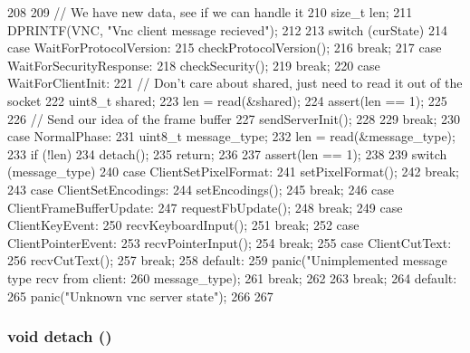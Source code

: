 \begin{DoxyCode}
208 {
209     // We have new data, see if we can handle it
210     size_t len;
211     DPRINTF(VNC, "Vnc client message recieved\n");
212 
213     switch (curState) {
214       case WaitForProtocolVersion:
215         checkProtocolVersion();
216         break;
217       case WaitForSecurityResponse:
218         checkSecurity();
219         break;
220       case WaitForClientInit:
221         // Don't care about shared, just need to read it out of the socket
222         uint8_t shared;
223         len = read(&shared);
224         assert(len == 1);
225 
226         // Send our idea of the frame buffer
227         sendServerInit();
228 
229         break;
230       case NormalPhase:
231         uint8_t message_type;
232         len = read(&message_type);
233         if (!len) {
234             detach();
235             return;
236         }
237         assert(len == 1);
238 
239         switch (message_type) {
240           case ClientSetPixelFormat:
241             setPixelFormat();
242             break;
243           case ClientSetEncodings:
244             setEncodings();
245             break;
246           case ClientFrameBufferUpdate:
247             requestFbUpdate();
248             break;
249           case ClientKeyEvent:
250             recvKeyboardInput();
251             break;
252           case ClientPointerEvent:
253             recvPointerInput();
254             break;
255           case ClientCutText:
256             recvCutText();
257             break;
258           default:
259             panic("Unimplemented message type recv from client: %
260                   message_type);
261             break;
262         }
263         break;
264       default:
265         panic("Unknown vnc server state\n");
266     }
267 }
\end{DoxyCode}
\hypertarget{classVncServer_ac295bade8aee589f6718dfa79edc2a34}{
\subsubsection[{detach}]{\setlength{\rightskip}{0pt plus 5cm}void detach ()}}
\label{classVncServer_ac295bade8aee589f6718dfa79edc2a34}



